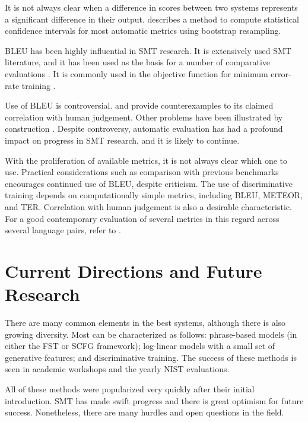 It is not always clear when a difference in scores
between two systems represents a significant difference in their
output.  \citet{Koehn:2004:emnlp} describes a method
to compute statistical confidence intervals for most automatic
metrics using bootstrap resampling.

BLEU has been highly influential in SMT research.
It is extensively used SMT literature, and it
has been used as the basis for a number of
comparative evaluations \citep{doddington:2002:hlt,Koehn:2005:wpt,Koehn:2006:smt,Callison-Burch:2007:smt}.
It is commonly used in the objective function for
minimum error-rate training \citep{Och:2003:acl}.

Use of BLEU is controversial.  
\citet{Turian:2003:mtsummit} and \citet{Callison-burch:2006:eacl}
provide counterexamples to its claimed correlation with human judgement.
Other problems have been illustrated by construction
\citep{Callison-burch:2006:eacl}.
Despite controversy, automatic evaluation has had a profound impact
on progress in SMT research, and it is likely to continue.

With the proliferation of available metrics, it is not always 
clear which one to use.  Practical considerations such as comparison 
with previous benchmarks encourages continued use of BLEU, despite 
criticism.  The use of discriminative training depends on computationally
simple metrics, including BLEU, METEOR, and TER.  Correlation with
human judgement is also a desirable characteristic.  For a good 
contemporary evaluation of several metrics in this regard across several
language pairs, refer to \citet{Callison-Burch:2007:smt}.

\section{Current Directions and Future Research}\label{sec:future-research}

There are many common
elements in the best systems, although there is also 
growing diversity.  Most can be characterized as follows: 
phrase-based models (in either the FST or SCFG framework);
log-linear models with a small set of generative
features; and discriminative training.  The success of these
methods is seen in academic workshops
\citep{Koehn:2005:wpt,Koehn:2006:smt,Callison-Burch:2007:smt}
and the yearly NIST evaluations.

All of these methods were popularized very quickly after their
initial introduction.  SMT has made swift progress
and there is great optimism for future success.
Nonetheless, there are many hurdles
and open questions in the field.

